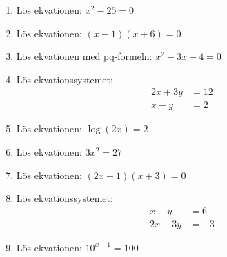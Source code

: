 \documentclass[a4paper,11pt]{article}
\begin{document}
\begin{enumerate}[label=\textbf{\arabic*.}]
    \item Lös ekvationen: $x^2 - 25 = 0$
    
    \item Lös ekvationen: $(x - 1)(x + 6) = 0$
    
    \item Lös ekvationen med pq-formeln: $x^2 - 3x - 4 = 0$
    
    \item Lös ekvationssystemet:
    \begin{align*}
    2x + 3y &= 12\\
    x - y &= 2
    \end{align*}
    
    \item Lös ekvationen: $\log (2x) = 2$
    
    \item Lös ekvationen: $3x^2 = 27$
    
    \item Lös ekvationen: $(2x - 1)(x + 3) = 0$
    
    \item Lös ekvationssystemet:
    \begin{align*}
    x + y &= 6\\
    2x - 3y &= -3
    \end{align*}
    
    \item Lös ekvationen: $10^{x-1} = 100$
\end{enumerate}
\end{document}
